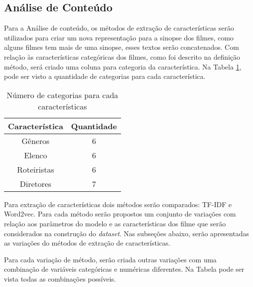 \subsection{Análise de Conteúdo}

Para a Análise de conteúdo, os métodos de extração de características serão utilizados para criar um nova representação para a sinopse dos filmes, como alguns filmes tem mais de uma sinopse, esses textos serão concatenados. Com relação às características categóricas dos filmes, como foi descrito na definição método, será criado uma coluna para categoria da característica. Na Tabela \ref{tab:n_categorias}, pode ser visto a quantidade de categorias para cada característica.

\begin{table}[h]
\label{tab:n_categorias}
 \centering
\begin{tabular}{|c| c |}
\hline
Característica &  Quantidade \\ 
\hline
Gêneros & 6  \\
\hline
Elenco & 6  \\ 
\hline
Roteiristas & 6 \\ 
\hline
Diretores & 7 \\
\hline    
\end{tabular}
\caption{\label{tab:n_categorias}Número de categorias para cada características}
\end{table}

Para extração de características dois métodos serão comparados: TF-IDF e Word2vec. Para cada método serão propostos um conjunto de variações com relação aos parâmetros do modelo e as características dos filme que serão considerados  na construção do \textit{dataset}. Nas subseções abaixo, serão apresentadas as variações do métodos de extração de características. 

Para cada variação de método, serão criada outras variações com uma combinação de variáveis categóricas e numéricas diferentes. Na Tabela \label{tab:combinacoes} pode ser vista todas as combinações possíveis.

